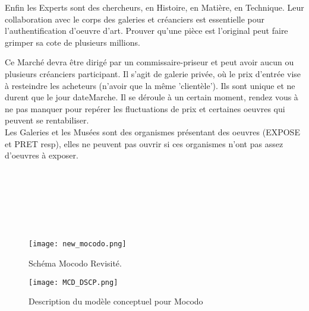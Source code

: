 \documentclass{article}
\begin{document}
    Enfin les Experts sont des chercheurs, en Histoire, en Matière, en Technique.
Leur collaboration avec le corps des galeries et créanciers est essentielle pour l'authentification d'oeuvre d'art.
Prouver qu'une pièce est l'original peut faire grimper sa cote de plusieurs millions.\cite{Christ's_Portrait}
\\

\begin{multicols}{2}
    Ce Marché devra être dirigé par un commissaire-priseur et peut avoir aucun ou plusieurs créanciers participant.
\newline Il s'agit de galerie privée, où le prix d'entrée vise à resteindre les acheteurs (n'avoir que la même 'clientèle'). Ils sont unique et ne durent que le jour dateMarche.
\newline Il se déroule à un certain moment, rendez vous à ne pas manquer pour repérer les fluctuations de prix et certaines oeuvres qui peuvent se rentabiliser.
\\

    Les Galeries et les Musées sont des organismes présentant des oeuvres (EXPOSE et PRET resp), elles ne peuvent pas ouvrir si ces organismes n'ont pas assez d'oeuvres à exposer.
\\ \\ \\ \\ \\ \\ \\
\end{multicols}

\clearpage


\begin{figure}[htp]
\centering
\texttt{[image: new\_mocodo.png]}
\caption{\label{fig:MCD_last}Schéma Mocodo Revisité.}
\end{figure}

\begin{figure}[htp]
\centering
\texttt{[image: MCD\_DSCP.png]}
\caption{\label{fig:MCD_DSCP}Description du modèle conceptuel pour Mocodo}
\end{figure}

\clearpage
\end{document}

